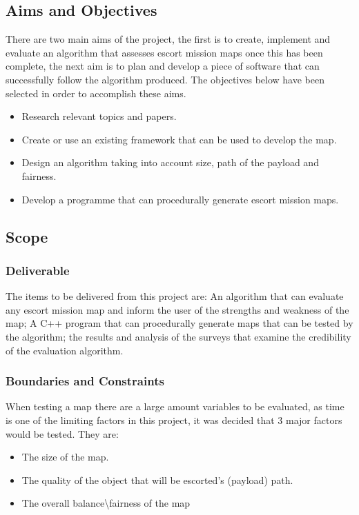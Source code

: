 \documentclass{article}
\begin{document}
\subsection{Aims and Objectives}
There are two main aims of the project, the first is to create, implement and evaluate an algorithm that assesses escort mission maps once this has been complete, the next aim is to plan and develop a piece of software that can successfully follow the algorithm produced. The objectives below have been selected in order to accomplish these aims.
\begin{itemize}
	\item Research relevant topics and papers.
	\item Create or use an existing framework that can be used to develop the map.
	\item Design an algorithm taking into account size, path of the payload and fairness. 
	\item Develop a programme that can procedurally generate escort mission maps.	
\end{itemize}
\subsection{Scope}
\subsubsection{Deliverable}
The items to be delivered from this project are: An algorithm that can evaluate any escort mission map and inform the user of the strengths and weakness of the map; A C++ program that can procedurally generate maps that can be tested by the algorithm; the results and analysis of the surveys that examine the credibility of the evaluation algorithm.  
\subsubsection{Boundaries and Constraints}
When testing a map there are a large amount variables to be evaluated, as time is one of the limiting factors in this project, it was decided that 3 major factors would be tested. They are:
\begin{itemize}
	\item The size of the map.
	\item The quality of the object that will be escorted's (payload) path.
	\item The overall balance\textbackslash fairness of the map 	
\end{itemize}
\end{document}
